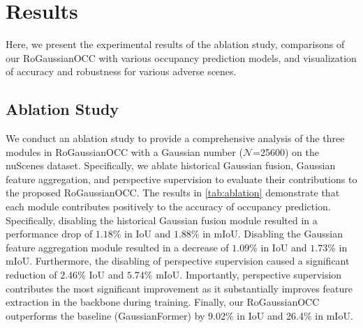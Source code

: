\documentclass[journal]{IEEEtran}
\begin{document}
\section{Results}
\label{sec:results}
Here, we present the experimental results of the ablation study, comparisons of our RoGaussianOCC with various occupancy prediction models, and visualization of accuracy and robustness for various adverse scenes.

\subsection{Ablation Study}

We conduct an ablation study to provide a comprehensive analysis of the three modules in RoGaussianOCC with a Gaussian number ({\small $\mathcal{N}$=25600}) on the nuScenes dataset. 
Specifically, we ablate historical Gaussian fusion, Gaussian feature aggregation, and perspective supervision to evaluate their contributions to the proposed RoGaussianOCC.
The results in \autoref{tab:ablation} demonstrate that each module contributes positively to the accuracy of occupancy prediction.
Specifically, disabling the historical Gaussian fusion module resulted in a performance drop of $1.18\%$ in IoU and $1.88\%$ in mIoU.
Disabling the Gaussian feature aggregation module resulted in a decrease of $1.09\%$ in IoU and $1.73\%$ in mIoU.
Furthermore, the disabling of perspective supervision caused a significant reduction of $2.46\%$ IoU and $5.74\%$ mIoU.
Importantly, perspective supervision contributes the most significant improvement as it substantially improves feature extraction in the backbone during training.
Finally, our RoGaussianOCC outperforms the baseline (GaussianFormer) by 9.02\% in IoU and 26.4\% in mIoU.
\end{document}
